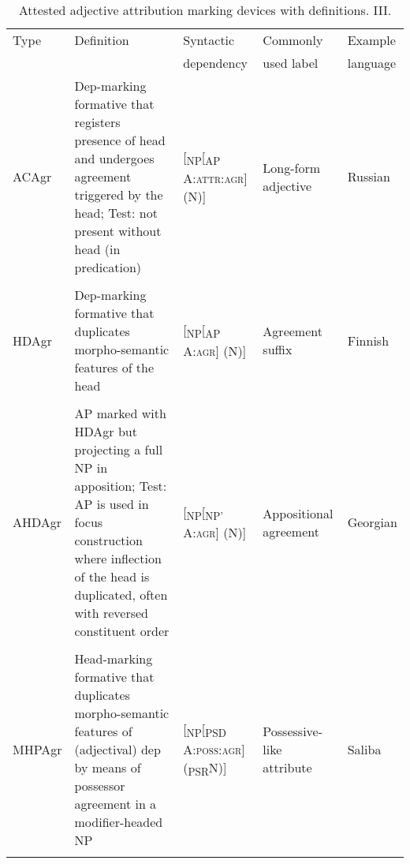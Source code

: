 \begin{sidewaystable}
\begin{tabularx}{\columnwidth}{l X l p{3.2cm} l}
\lsptoprule
Type	&Definition&Syntactic&Commonly&Example\\
	&		&dependency&used label&language\\
\midrule
ACAgr	&Dep-marking formative that registers presence of head and undergoes agreement triggered by the head; Test: not present without head (in predication)&{\upshape [}\textsubscript{NP}[\textsubscript{AP} A\textsc{:attr:agr}{\upshape ]} (N){\upshape ]}
		&Long-form adjective	&Russian\il{Russian}\\
\\
HDAgr	&Dep-marking formative that duplicates morpho-semantic features of the head&{\upshape [}\textsubscript{NP}[\textsubscript{AP} A:\textsc{agr}{\upshape ]} (N){\upshape ]}
		&Agreement suffix		&Finnish\il{Finnish}\\
\\
AHDAgr	&AP marked with HDAgr but projecting a full NP in apposition; Test: AP is used in focus construction where inflection of the head is duplicated, often with reversed constituent order&{\upshape [}\textsubscript{NP}[\textsubscript{NP'} A:\textsc{agr}{\upshape ]} (N){\upshape ]}
		&Appositional agreement	&Georgian\il{Georgian}\\
\\
MHPAgr	&Head-marking formative that duplicates morpho-semantic features of (adjectival) dep by means of possessor agreement in a modifier\hyp{}headed NP&{\upshape [}\textsubscript{NP}[\textsubscript{PSD} A:\textsc{poss:agr}{\upshape ]}(\textsubscript{PSR}N){\upshape ]}
		&Possessive-like attribute&Saliba\il{Saliba}\\
\lspbottomrule
\end{tabularx}
\caption[Ontology: Definitions III]{Attested adjective attribution marking devices with definitions. III.}
\label{tabledefontology3}
\end{sidewaystable}

